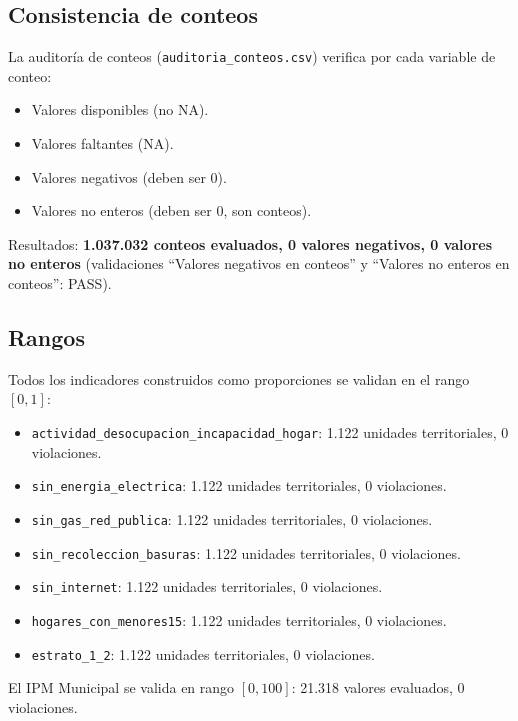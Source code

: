 \subsection{Consistencia de conteos}
\label{sec:consistencia_conteos}

La auditoría de conteos (\texttt{auditoria\_conteos.csv}) verifica por cada variable de conteo:

\begin{itemize}
    \item Valores disponibles (no NA).
    \item Valores faltantes (NA).
    \item Valores negativos (deben ser 0).
    \item Valores no enteros (deben ser 0, son conteos).
\end{itemize}

Resultados: \textbf{1.037.032 conteos evaluados, 0 valores negativos, 0 valores no enteros} (validaciones ``Valores negativos en conteos'' y ``Valores no enteros en conteos'': PASS).

\subsection{Rangos}
\label{sec:rangos}

Todos los indicadores construidos como proporciones se validan en el rango $[0,1]$:

\begin{itemize}
    \item \texttt{actividad\_desocupacion\_incapacidad\_hogar}: 1.122 unidades territoriales, 0 violaciones.
    \item \texttt{sin\_energia\_electrica}: 1.122 unidades territoriales, 0 violaciones.
    \item \texttt{sin\_gas\_red\_publica}: 1.122 unidades territoriales, 0 violaciones.
    \item \texttt{sin\_recoleccion\_basuras}: 1.122 unidades territoriales, 0 violaciones.
    \item \texttt{sin\_internet}: 1.122 unidades territoriales, 0 violaciones.
    \item \texttt{hogares\_con\_menores15}: 1.122 unidades territoriales, 0 violaciones.
    \item \texttt{estrato\_1\_2}: 1.122 unidades territoriales, 0 violaciones.
\end{itemize}

El IPM Municipal se valida en rango $[0,100]$: 21.318 valores evaluados, 0 violaciones.

